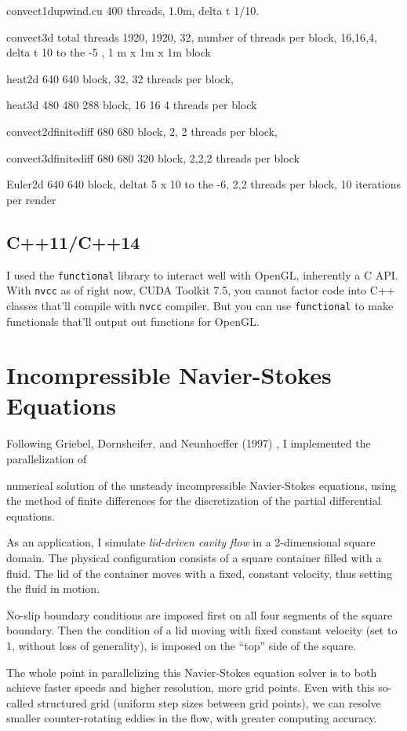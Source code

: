 \documentclass[10pt]{amsart}
\begin{document}
convect1dupwind.cu 400 threads, 1.0m, delta t 1/10.

convect3d total threads 1920, 1920, 32, number of threads per block, 16,16,4, delta t 10 to the -5 , 1 m x 1m x 1m block

heat2d 640 640 block, 32, 32 threads per block,

heat3d 480 480 288 block, 16 16 4 threads per block 

convect2dfinitediff 680 680 block, 2, 2 threads per block,

convect3dfinitediff 680 680 320 block, 2,2,2 threads per block

Euler2d 640 640 block, deltat 5 x 10 to the -6, 2,2 threads per block, 10 iterations per render

\subsection{C++11/C++14}

I used the \verb|functional| library to interact well with OpenGL, inherently a C API.  With \verb|nvcc| as of right now, CUDA Toolkit 7.5, you cannot factor code into C++ classes that'll compile with \verb|nvcc| compiler.  But you can use \verb|functional| to make functionals that'll output out functions for OpenGL.  

\section{Incompressible Navier-Stokes Equations}

Following Griebel, Dornsheifer, and Neunhoeffer (1997) \cite{GDN1997}, I implemented the parallelization of 

numerical solution of the unsteady incompressible Navier-Stokes equations, using the method of finite differences for the discretization of the partial differential equations.  

As an application, I simulate \emph{lid-driven cavity flow} in a 2-dimensional square domain.  The physical configuration consists of a square container filled with a fluid.  The lid of the container moves with a fixed, constant velocity, thus setting the fluid in motion.

No-slip boundary conditions are imposed first on all four segments of the square boundary.  Then the condition of a lid moving with fixed constant velocity (set to 1, without loss of generality), is imposed on the ``top'' side of the square.

The whole point in parallelizing this Navier-Stokes equation solver is to both achieve faster speeds and higher resolution, more grid points.  Even with this so-called structured grid (uniform step sizes between grid points), we can resolve smaller counter-rotating eddies in the flow, with greater computing accuracy.  
\end{document}
